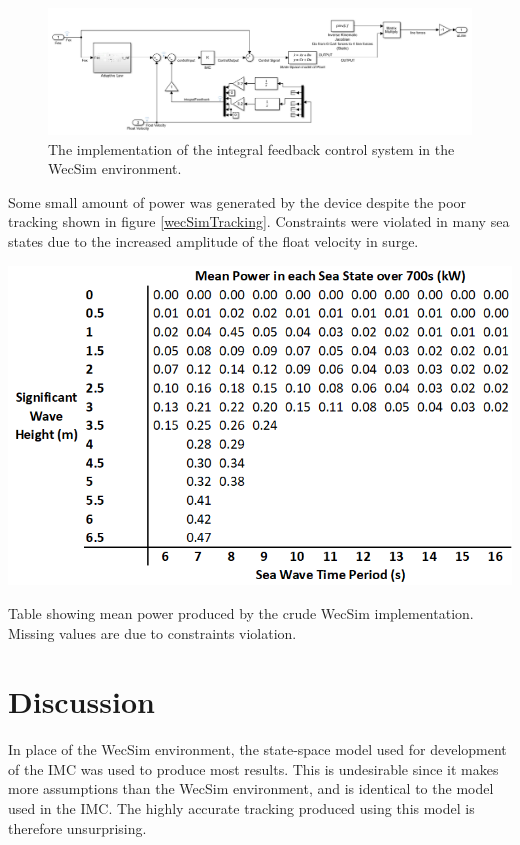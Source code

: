 \documentclass{report}
\begin{document}
\begin{figure}
\centering
\includegraphics[scale=0.5]{graphics/wecSimImplementation}
\caption{The implementation of the integral feedback control system in the WecSim environment.}
\label{wecSimImplementation}
\end{figure} 

Some small amount of power was generated by the device despite the poor tracking shown in figure \ref{wecSimTracking}. Constraints were violated in many sea states due to the increased amplitude of the float velocity in surge.

\begin{table}
\centering
\includegraphics[scale=0.7]{tables/wecSimResults}
\caption{Table showing mean power produced by the crude WecSim implementation. Missing values are due to constraints violation.}
\label{integralPosition}
\end{table}

\chapter{Discussion}

In place of the WecSim environment, the state-space model used for development of the IMC was used to produce most results. This is undesirable since it makes more assumptions than the WecSim environment, and is identical to the model used in the IMC. The highly accurate tracking produced using this model is therefore unsurprising.
\end{document}

